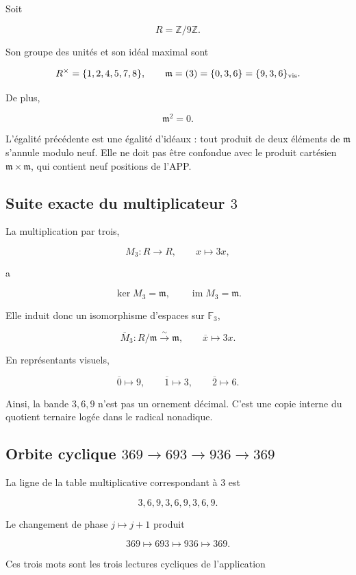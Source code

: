 Soit

\[
R=\mathbb Z/9\mathbb Z.
\]

Son groupe des unités et son idéal maximal sont

\[
R^\times=\{1,2,4,5,7,8\},
\qquad
\mathfrak m=(3)=\{0,3,6\}=\{9,3,6\}_{\rm vis}.
\]

De plus,

\[
\mathfrak m^2=0.
\]

L’égalité précédente est une égalité d’idéaux : tout produit de deux éléments de \(\mathfrak m\) s’annule modulo neuf. Elle ne doit pas être confondue avec le produit cartésien \(\mathfrak m\times\mathfrak m\), qui contient neuf positions de l’APP.

\subsection{Suite exacte du multiplicateur \(3\)}

La multiplication par trois,

\[
M_3:R\longrightarrow R,
\qquad x\longmapsto3x,
\]

a

\[
\ker M_3=\mathfrak m,
\qquad
\operatorname{im}M_3=\mathfrak m.
\]

Elle induit donc un isomorphisme d’espaces sur \(\mathbb F_3\),

\[
\overline M_3:R/\mathfrak m\xrightarrow{\sim}\mathfrak m,
\qquad
\overline x\longmapsto3x.
\]

En représentants visuels,

\[
\overline0\longmapsto9,
\qquad
\overline1\longmapsto3,
\qquad
\overline2\longmapsto6.
\]

Ainsi, la bande \(3,6,9\) n’est pas un ornement décimal. C’est une copie interne du quotient ternaire logée dans le radical nonadique.

\subsection{Orbite cyclique \(369\to693\to936\to369\)}

La ligne de la table multiplicative correspondant à \(3\) est

\[
3,6,9,3,6,9,3,6,9.
\]

Le changement de phase \(j\mapsto j+1\) produit

\[
369\longmapsto693\longmapsto936\longmapsto369.
\]

Ces trois mots sont les trois lectures cycliques de l’application

